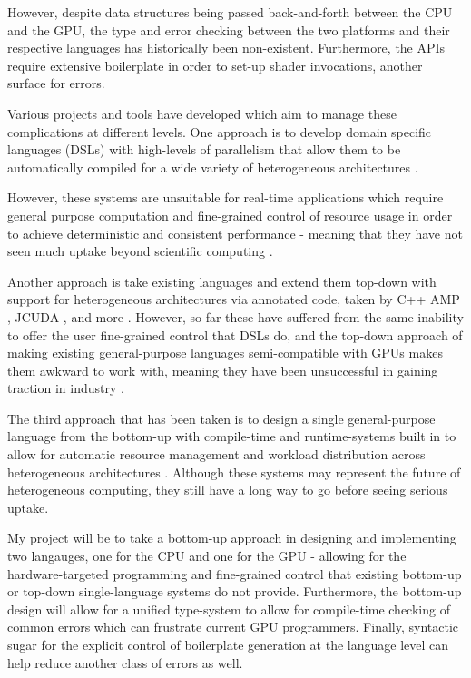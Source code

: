 \documentclass[11pt]{article}
\begin{document}
However, despite data structures being passed back-and-forth between the CPU and
the GPU, the type and error checking between the two platforms and their
respective languages has historically been non-existent. Furthermore, the APIs
require extensive boilerplate in order to set-up shader invocations, another
surface for errors.

Various projects and tools have developed which aim to manage these
complications at different levels. One approach is to develop domain specific
languages (DSLs) with high-levels of parallelism that allow them to be
automatically compiled for a wide variety of heterogeneous architectures
\cite{DSL1} \cite{DSL2} \cite{Theano2016}.

However, these systems are unsuitable for real-time applications which require
general purpose computation and fine-grained control of resource usage in order
to achieve deterministic and consistent performance - meaning that they have not
seen much uptake beyond scientific computing \cite{Theano2016}.

Another approach is take existing languages and extend them top-down with
support for heterogeneous architectures via annotated code, taken by C++ AMP
\cite{CAMP}, JCUDA \cite{JCUDA2009}, and more \cite{SYCL} \cite{HCC}
\cite{Theano2016} \cite{CParallel}. However, so far these have suffered from
the same inability to offer the user fine-grained control that DSLs do, and the
top-down approach of making existing general-purpose languages semi-compatible
with GPUs makes them awkward to work with, meaning they have been unsuccessful
in gaining traction in industry \cite{CAMPFail1} \cite{CAMPFail2}.

The third approach that has been taken is to design a single general-purpose
language from the bottom-up with compile-time and runtime-systems built in to
allow for automatic resource management and workload distribution across
heterogeneous architectures \cite{Lime2012} \cite{Lime2010}. Although these
systems may represent the future of heterogeneous computing, they still have a
long way to go before seeing serious uptake.

My project will be to take a bottom-up approach in designing and implementing
two langauges, one for the CPU and one for the GPU - allowing for the
hardware-targeted programming and fine-grained control that existing bottom-up
or top-down single-language systems do not provide. Furthermore, the bottom-up
design will allow for a unified type-system to allow for compile-time checking
of common errors which can frustrate current GPU programmers. Finally,
syntactic sugar for the explicit control of boilerplate generation at the
language level can help reduce another class of errors as well.
\end{document}
